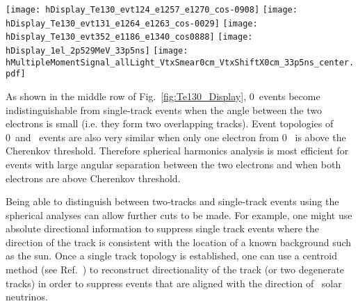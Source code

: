 \begin{figure*}[h]
  \centering
  \texttt{[image: hDisplay\_Te130\_evt124\_e1257\_e1270\_cos-0908]}
  \texttt{[image: hDisplay\_Te130\_evt131\_e1264\_e1263\_cos-0029]}
  \texttt{[image: hDisplay\_Te130\_evt352\_e1186\_e1340\_cos0888]}
  \texttt{[image: hDisplay\_1el\_2p529MeV\_33p5ns]}
  \texttt{[image: hMultipleMomentSignal\_allLight\_VtxSmear0cm\_VtxShiftX0cm\_33p5ns\_center.pdf]} 
  \caption{ (\emph{Top and middle rows:} Event display examples for {\Te} 0{\nbb}-decay signal and {\B} background events.
    The default QE and the time cut of 33.5~ns are now applied to cherenkov (\emph{triangles} and scintillation (\emph{crosses}) 
    photons. For the {\Te} 0{\nbb}-decay signal three representative events are shown each closely matching on of the three
    topologies. A typical single electron event is shown for the {\B} background.
    \emph{Top left:} $^{130}$Te 0{\nbb}-decay back-to-back electrons: $E_1$=1.257~MeV, $E_2$=1.270~MeV, 
    cos($\theta$)=-0.908. \emph{Top right:} $^{130}$Te 0{\nbb}-decay electrons at $\sim$90$^{\circ}$: $E_1$=1.264~MeV, $E_2$=1.263~MeV,
    cos($\theta$)=-0.029. \emph{Middle left:} $^{130}$Te 0{\nbb}-decay electrons at $\sim$0$^{\circ}$: $E_1$=1.186~MeV, $E_2$=1.340~MeV,
    cos($\theta$)=0.888. \emph{Middle right:} 2.529~MeV single electron. In all events electrons originate at the center of the detector.
    \emph{Bottom pannel:} Normalized power spectrum $S_l$ calculated for distribution of all PE after the 33.5~ns time cut. 
    {\Te} 0{\nbb}-decay signal (\emph{solid red line}) and {\B} background (\emph{dashed blue line}) topologies are compared.}
\label{fig:Te130_Display}
\end{figure*}


As shown in the middle row of Fig.~\ref{fig:Te130_Display}, 0\nbb~events become indistinguishable from single-track events when the angle between the two electrons is small (i.e. they form two overlapping tracks). Event topologies of 0\nbb~and \B~events are also very similar when only one electron from 0\nbb~ is above the Cherenkov threshold. Therefore spherical harmonics analysis is most efficient for events with large angular separation between the two electrons and when both electrons are above Cherenkov threshold.

Being able to distinguish between two-tracks and single-track events using the spherical analyses can allow further cuts to be made.  For example, one might use absolute directional information to suppress single track events where the direction of the track is consistent with the location of a known background such as the sun. Once a single track topology is established, one can use a centroid method (see Ref.~\cite{Directionality}) to reconstruct directionality of the track (or two degenerate tracks) in order to suppress events that are aligned with the direction of \B~solar neutrinos.


